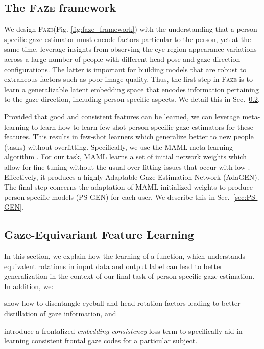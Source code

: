 \documentclass[10pt,twocolumn,letterpaper]{article}
\newcommand{\faze}[0]{\textsc{Faze}\xspace}
\begin{document}
\subsection{The \faze framework\label{sec:Faze}}
We design \faze (Fig. \ref{fig:faze_framework}) with the understanding that a person-specific gaze estimator must encode factors particular to the person, yet at the same time, leverage insights from observing the eye-region appearance variations across a large number of people with different head pose and gaze direction configurations.
The latter is important for building models that are robust to extraneous factors such as poor image quality.
Thus, the first step in \faze is to learn a generalizable latent embedding space that encodes information pertaining to the gaze-direction, including person-specific aspects.
We detail this in Sec.~\ref{sec:RotAE}.

Provided that good and consistent features can be learned, we can leverage meta-learning to learn how to learn few-shot person-specific gaze estimators for these features.
This results in few-shot learners which generalize better to new people (tasks) without overfitting. 
Specifically, we use the MAML meta-learning algorithm \cite{Finn2017ICML}. 
For our task, MAML learns a set of initial network weights which allow for fine-tuning without the usual over-fitting issues that occur with low . Effectively, it produces a highly Adaptable Gaze Estimation Network (AdaGEN).
The final step concerns the adaptation of MAML-initialized weights to produce person-specific models (PS-GEN) for each user.
We describe this in Sec.~\ref{sec:PS-GEN}.


\subsection{Gaze-Equivariant Feature Learning}\label{sec:RotAE}





In this section, we explain how the learning of a function, which understands equivalent rotations in input data and output label can lead to better generalization in the context of our final task of person-specific gaze estimation.
In addition, we: \begin{inparaenum}[(a)]
\item show how to disentangle eyeball and head rotation factors leading to better distillation of gaze information,
and 
\item introduce a frontalized \emph{embedding consistency} loss term to specifically aid in learning consistent frontal gaze codes for a particular subject.
\end{inparaenum}
\end{document}
